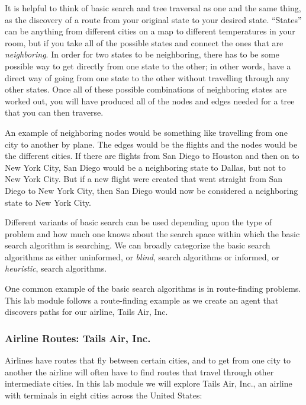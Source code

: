 It is helpful to think of basic search and tree traversal as one and the same 
thing, as the discovery of a route from your original state to your desired 
state.  ``States'' can be anything from different cities on a map to different 
temperatures in your room, but if you take all of the possible states and 
connect the ones that are \emph{neighboring}. In order for two states to be 
neighboring, there has to be some possible way to get directly from one state 
to the other; in other words, have a direct way of going from one state to the 
other without travelling through any other states. Once all of these possible
combinations of neighboring states are worked out, you will have produced all 
of the nodes and edges needed for a tree that you can then traverse.

An example of neighboring nodes would be something like travelling from one 
city to another by plane. The edges would be the flights and the nodes would be 
the different cities. If there are flights from San Diego to Houston and then 
on to New York City, San Diego would be a neighboring state to Dallas, but not 
to New York City. But if a new flight were created that went straight from San 
Diego to New York City, then San Diego would now be considered a neighboring 
state to New York City.

Different variants of basic search can be used depending
upon the type of problem and how much one knows about the search space within
which the basic search algorithm is searching.  We can broadly categorize the
basic search algorithms as either uninformed, or \emph{blind}, search 
algorithms or informed, or \emph{heuristic}, search algorithms.

One common example of the basic search algorithms is in route-finding
problems.  This lab module follows a route-finding example as we create an
agent that discovers paths for our airline, Tails Air, Inc.

\subsubsection{Airline Routes: Tails Air, Inc.}
Airlines have routes that fly between certain cities, and to get from one
city to another the airline will often have to find routes that travel through
other intermediate cities.  In this lab module we will explore Tails Air, Inc., 
an airline with terminals in eight cities across the United States:

